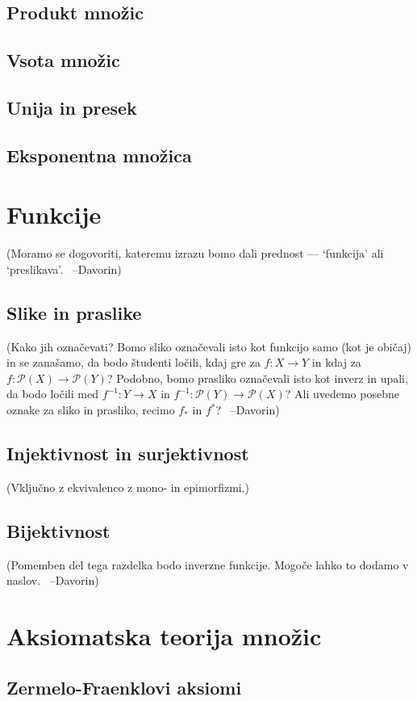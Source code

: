 \documentclass[11pt,a4paper,twoside]{book}
\newcommand{\davorin}[1]{{\small\textcolor{davorincolor}{(#1 \ \mbox{--Davorin})}}}
\newcommand{\note}[1]{{\small\textcolor{notecolor}{(#1)}}}
\newcommand{\pst}{\mathcal{P}}
\begin{document}
		\section{Produkt množic}
		\section{Vsota množic}
		\section{Unija in presek}
		\section{Eksponentna množica}
	
	\chapter{Funkcije}
		\davorin{Moramo se dogovoriti, kateremu izrazu bomo dali prednost --- `funkcija' ali `preslikava'.}
		\section{Slike in praslike}
			\davorin{Kako jih označevati? Bomo sliko označevali isto kot funkcijo samo (kot je običaj) in se zanašamo, da bodo študenti ločili, kdaj gre za $f\colon X \to Y$ in kdaj za $f\colon \pst(X) \to \pst(Y)$? Podobno, bomo prasliko označevali isto kot inverz in upali, da bodo ločili med $f^{-1}\colon Y \to X$ in $f^{-1}\colon \pst(Y) \to \pst(X)$? Ali uvedemo posebne oznake za sliko in prasliko, recimo $f_*$ in $f^*$?}
		\section{Injektivnost in surjektivnost}
			\note{Vključno z ekvivalenco z mono- in epimorfizmi.}
		\section{Bijektivnost}
			\davorin{Pomemben del tega razdelka bodo inverzne funkcije. Mogoče lahko to dodamo v naslov.}
	
	
	
	\chapter{Aksiomatska teorija množic}
		\section{Zermelo-Fraenklovi aksiomi}
\end{document}
